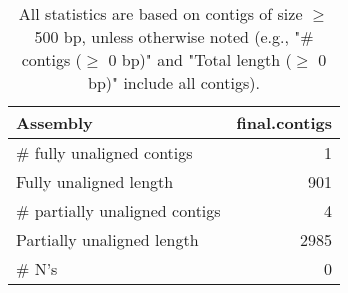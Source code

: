 \documentclass[12pt,a4paper]{article}
\begin{document}
\begin{table}[ht]
\begin{center}
\caption{All statistics are based on contigs of size $\geq$ 500 bp, unless otherwise noted (e.g., "\# contigs ($\geq$ 0 bp)" and "Total length ($\geq$ 0 bp)" include all contigs).}
\begin{tabular}{|l*{1}{|r}|}
\hline
Assembly & final.contigs \\ \hline
\# fully unaligned contigs & 1 \\ \hline
Fully unaligned length & 901 \\ \hline
\# partially unaligned contigs & 4 \\ \hline
Partially unaligned length & 2985 \\ \hline
\# N's & 0 \\ \hline
\end{tabular}
\end{center}
\end{table}
\end{document}
